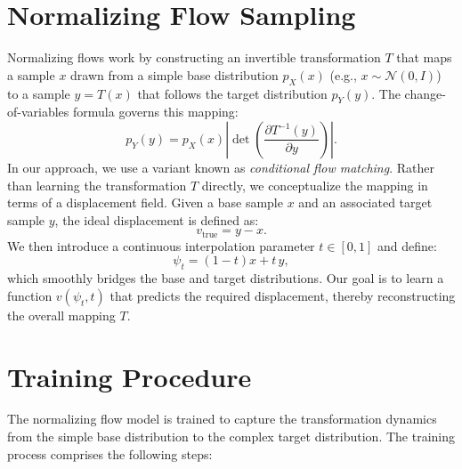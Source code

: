 \section{Normalizing Flow Sampling}
Normalizing flows work by constructing an invertible transformation \( T \) that maps a sample \( x \) drawn from a simple base distribution \( p_X(x) \) (e.g., \( x \sim \mathcal{N}(0, I) \)) to a sample \( y = T(x) \) that follows the target distribution \( p_Y(y) \). The change-of-variables formula governs this mapping:
\[
p_Y(y) = p_X(x) \left| \det \left( \frac{\partial T^{-1}(y)}{\partial y} \right) \right|.
\]
In our approach, we use a variant known as \emph{conditional flow matching}. Rather than learning the transformation \( T \) directly, we conceptualize the mapping in terms of a displacement field. Given a base sample \( x \) and an associated target sample \( y \), the ideal displacement is defined as:
\[
v_{\text{true}} = y - x.
\]
We then introduce a continuous interpolation parameter \( t \in [0,1] \) and define:
\[
\psi_t = (1-t)x + t\, y,
\]
which smoothly bridges the base and target distributions. Our goal is to learn a function \( v(\psi_t, t) \) that predicts the required displacement, thereby reconstructing the overall mapping \( T \).

\section{Training Procedure}
The normalizing flow model is trained to capture the transformation dynamics from the simple base distribution to the complex target distribution. The training process comprises the following steps:

